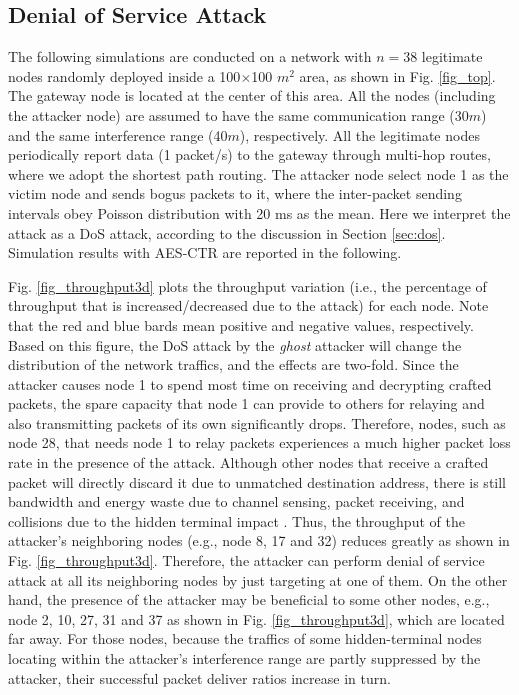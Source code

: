 \documentclass[10pt,journal,cspaper,compsoc]{IEEEtran}
\begin{document}
\subsection{Denial of Service Attack}
The following simulations are conducted on a network with $n=38$ legitimate nodes randomly deployed inside a 100$\times$100 $m^2$ area, as shown in Fig. \ref{fig_top}. The gateway node is located at the center of this area. All the nodes (including the attacker node) are assumed to have the same communication range (30$m$) and the same interference range (40$m$), respectively. All the legitimate nodes periodically report data (1 packet/s) to the gateway through multi-hop routes, where we adopt the shortest path routing. The attacker node select node 1 as the victim node and sends bogus packets to it, where the inter-packet sending intervals obey Poisson distribution with 20 ms as the mean. Here we interpret the attack as a DoS attack, according to the discussion in Section \ref{sec:dos}. Simulation results with AES-CTR are reported in the following.

Fig. \ref{fig_throughput3d} plots the throughput variation (i.e., the percentage of throughput that is increased/decreased due to the attack) for each node. Note that the red and blue bards mean positive and negative values, respectively. Based on this figure, the DoS attack by the {\em ghost} attacker will change the distribution of the network traffics, and the effects are two-fold. Since the attacker causes node 1 to spend most time on receiving and decrypting crafted packets, the spare capacity that node 1 can provide to others for relaying and also transmitting packets of its own significantly drops. Therefore, nodes, such as node 28, that needs node 1 to relay packets experiences a much higher packet loss rate in the presence of the attack. Although other nodes that receive a crafted packet will directly discard it due to unmatched destination address, there is still bandwidth and energy waste due to channel sensing, packet receiving, and collisions due to the hidden terminal impact \cite{tsertou2008revisiting}. Thus, the throughput of the attacker's neighboring nodes (e.g., node 8, 17 and 32) reduces greatly as shown in Fig. \ref{fig_throughput3d}. Therefore, the attacker can perform denial of service attack at all its neighboring nodes by just targeting at one of them. On the other hand, the presence of the attacker may be beneficial to some other nodes, e.g., node 2, 10, 27, 31 and 37 as shown in Fig. \ref{fig_throughput3d}, which are located far away. For those nodes, because the traffics of some hidden-terminal nodes locating within the attacker's interference range are partly suppressed by the attacker, their successful packet deliver ratios increase in turn.
\end{document}
